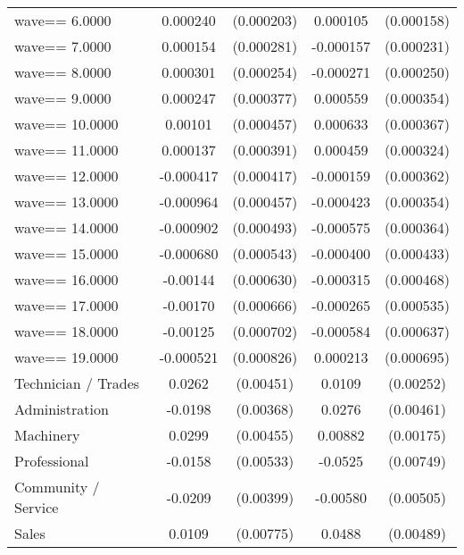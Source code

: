 {\begin{tabular}{l*{2}{cc}}
wave==     6.0000   &    0.000240         &  (0.000203)&    0.000105         &  (0.000158)\\
wave==     7.0000   &    0.000154         &  (0.000281)&   -0.000157         &  (0.000231)\\
wave==     8.0000   &    0.000301         &  (0.000254)&   -0.000271         &  (0.000250)\\
wave==     9.0000   &    0.000247         &  (0.000377)&    0.000559         &  (0.000354)\\
wave==    10.0000   &     0.00101\sym{**} &  (0.000457)&    0.000633\sym{*}  &  (0.000367)\\
wave==    11.0000   &    0.000137         &  (0.000391)&    0.000459         &  (0.000324)\\
wave==    12.0000   &   -0.000417         &  (0.000417)&   -0.000159         &  (0.000362)\\
wave==    13.0000   &   -0.000964\sym{**} &  (0.000457)&   -0.000423         &  (0.000354)\\
wave==    14.0000   &   -0.000902\sym{*}  &  (0.000493)&   -0.000575         &  (0.000364)\\
wave==    15.0000   &   -0.000680         &  (0.000543)&   -0.000400         &  (0.000433)\\
wave==    16.0000   &    -0.00144\sym{**} &  (0.000630)&   -0.000315         &  (0.000468)\\
wave==    17.0000   &    -0.00170\sym{**} &  (0.000666)&   -0.000265         &  (0.000535)\\
wave==    18.0000   &    -0.00125\sym{*}  &  (0.000702)&   -0.000584         &  (0.000637)\\
wave==    19.0000   &   -0.000521         &  (0.000826)&    0.000213         &  (0.000695)\\
Technician / Trades &      0.0262\sym{***}&   (0.00451)&      0.0109\sym{***}&   (0.00252)\\
Administration      &     -0.0198\sym{***}&   (0.00368)&      0.0276\sym{***}&   (0.00461)\\
Machinery           &      0.0299\sym{***}&   (0.00455)&     0.00882\sym{***}&   (0.00175)\\
Professional        &     -0.0158\sym{***}&   (0.00533)&     -0.0525\sym{***}&   (0.00749)\\
Community / Service &     -0.0209\sym{***}&   (0.00399)&    -0.00580         &   (0.00505)\\
Sales               &      0.0109         &   (0.00775)&      0.0488\sym{***}&   (0.00489)\\

\end{tabular}}

